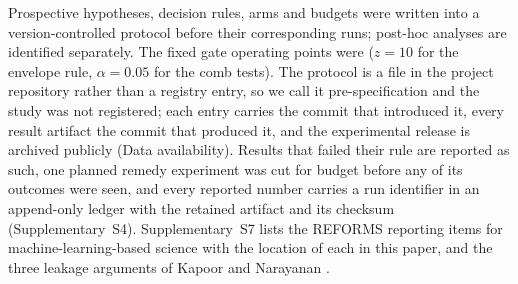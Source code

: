 Prospective hypotheses, decision rules, arms and budgets were written into a version-controlled protocol before their corresponding runs; post-hoc analyses are identified separately. The fixed gate operating points were ($z = 10$ for the envelope rule, $\alpha = 0.05$ for the comb tests). The protocol
is a file in the project repository rather than a registry entry, so we call it pre-specification and the study was not registered; each entry carries the
commit that introduced it, every result artifact the commit that produced it, and the experimental release is archived publicly (Data availability). Results that failed their rule are reported as such, one planned remedy experiment was cut
for budget before any of its outcomes were seen, and every reported number carries a run identifier in an append-only ledger
with the retained artifact and its checksum (Supplementary~S4). Supplementary~S7 lists the REFORMS reporting items for
machine-learning-based science \cite{kapoor2024reforms} with the location of each in this paper, and the three leakage
arguments of Kapoor and Narayanan \cite{kapoor2023leakage}.
